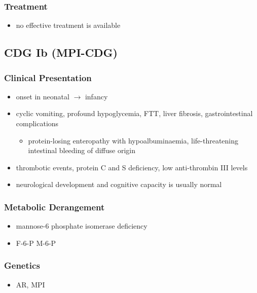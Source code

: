 \documentclass[12pt]{scrartcl}
\begin{document}
\subsubsection{Treatment}
\label{sec:org078d4ed}
\begin{itemize}
\item no effective treatment is available
\end{itemize}

\subsection{CDG Ib (MPI-CDG)}
\label{sec:orgc5ab2cf}
\subsubsection{Clinical Presentation}
\label{sec:org0f85d6b}
\begin{itemize}
\item onset in neonatal \(\to\) infancy
\item cyclic vomiting, profound hypoglycemia, FTT, liver
fibrosis, gastrointestinal complications
\begin{itemize}
\item protein-losing enteropathy with hypoalbuminaemia, life-threatening
intestinal bleeding of diffuse origin
\end{itemize}
\item thrombotic events, protein C and S deficiency, low anti-thrombin III levels
\item neurological development and cognitive capacity is usually normal
\end{itemize}

\subsubsection{Metabolic Derangement}
\label{sec:orge812c51}
\begin{itemize}
\item mannose-6 phosphate isomerase deficiency
\item F-6-P \ce{<=>[MPI]} M-6-P
\end{itemize}

\subsubsection{Genetics}
\label{sec:org9a0c801}
\begin{itemize}
\item AR, MPI
\end{itemize}
\end{document}

